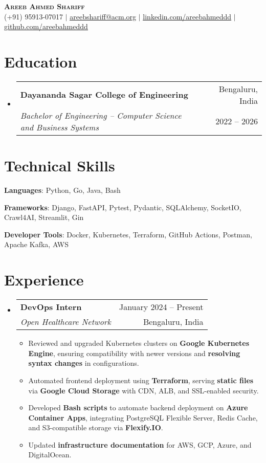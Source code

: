 \documentclass[a4paper,11pt]{article}
\makeatletter
\newcommand{\resumeItem}[1]{\item\small{#1 \vspace{-2pt}}}
\newcommand{\resumePosition}[4]{
    \vspace{-2pt}\item
    \begin{tabular*}{0.97\textwidth}[t]{l@{\extracolsep{\fill}}r}
        \textbf{#1} & #2 \\
        \textit{\small#3} & \small #4 \\
    \end{tabular*}\vspace{-7pt}
}
\newcommand{\resumeSubHeadingListStart}{\begin{itemize}[leftmargin=0.15in, label={}]}
\newcommand{\resumeSubHeadingListEnd}{\end{itemize}}
\newcommand{\resumeItemListStart}{\begin{itemize}}
\newcommand{\resumeItemListEnd}{\end{itemize}\vspace{-5pt}}
\makeatother
\begin{document}
\begin{center}
    \textbf{\Huge \scshape Areeb Ahmed Shariff} \\ \vspace{1pt}
    \small (+91) 95913-07017 $|$ \href{mailto:areebshariff@acm.org}{\underline{areebshariff@acm.org}} $|$
    \href{https://linkedin.com/in/areebahmeddd}{\underline{linkedin.com/areebahmeddd}} $|$
    \href{https://github.com/areebahmeddd}{\underline{github.com/areebahmeddd}}
\end{center}

\section{Education}
\resumeSubHeadingListStart
    \resumePosition
        {Dayananda Sagar College of Engineering}{Bengaluru, India}
        {Bachelor of Engineering -- Computer Science and Business Systems}{2022 -- 2026}
\resumeSubHeadingListEnd

\section{Technical Skills}
\begin{itemize}[leftmargin=0.15in, label={}, itemsep=-2pt]
    \small{
        \item{\textbf{Languages}{: Python, Go, Java, Bash}}
        \item{\textbf{Frameworks}{: Django, FastAPI, Pytest, Pydantic, SQLAlchemy, SocketIO, Crawl4AI, Streamlit, Gin}}
        \item{\textbf{Developer Tools}{: Docker, Kubernetes, Terraform, GitHub Actions, Postman, Apache Kafka, AWS}}
    }
\end{itemize}

\section{Experience}
\resumeSubHeadingListStart
    \resumePosition
        {DevOps Intern}{January 2024 -- Present}
        {Open Healthcare Network}{Bengaluru, India}
    \resumeItemListStart
        \resumeItem{Reviewed and upgraded Kubernetes clusters on \textbf{Google Kubernetes Engine}, ensuring compatibility with newer versions and \textbf{resolving syntax changes} in configurations.}
        \resumeItem{Automated frontend deployment using \textbf{Terraform}, serving \textbf{static files} via \textbf{Google Cloud Storage} with CDN, ALB, and SSL-enabled security.}
        \resumeItem{Developed \textbf{Bash scripts} to automate backend deployment on \textbf{Azure Container Apps}, integrating PostgreSQL Flexible Server, Redis Cache, and S3-compatible storage via \textbf{Flexify.IO}.}
        \resumeItem{Updated \textbf{infrastructure documentation} for AWS, GCP, Azure, and DigitalOcean.}
    \resumeItemListEnd
\resumeSubHeadingListEnd
\end{document}
